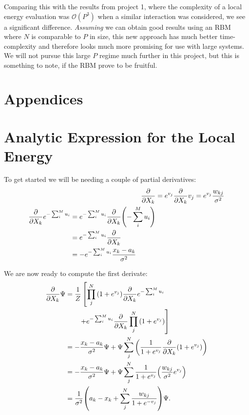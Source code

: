 \documentclass[a4paper, 11pt]{article}
\begin{document}
\begin{multicols}{2}
    Comparing this with the results from project 1, where the complexity of a
    local energy evaluation was $\mathcal{O}(P^3)$ when a similar interaction
    was considered, we see a significant
    difference. \emph{Assuming} we can obtain good results using an RBM where $N$ is
    comparable to $P$ in size, this new approach has much better time-complexity
    and therefore looks much more promising for use with large systems. We will
    not pursue this large $P$ regime much further in this project, but this is
    something to note, if the RBM prove to be fruitful.


    \printbibliography

\end{multicols}




\pagebreak
\begin{multicols}{2}
    \appendix
    \section*{Appendices}

    \section{Analytic Expression for the Local Energy}
    \label{app:E-L-derivation}
    
    To get started we will be needing a couple of partial derivatives:
   \begin{align}
        \pdv{}{X_k} (1+e^{v_j}) &=e^{v_j}\pdv{}{X_k}v_j =
        e^{v_j} \frac{w_{kj}}{\sigma^2}\\
        \begin{split}
        \pdv{}{X_k}e^{-\sum_i^M u_i} &= e^{-\sum_i^M
        u_i}\pdv{}{X_k}\qty(-\sum_i^M u_i) \\
        &= e^{-\sum_i^M u_i}\pdv{}{X_k} (-u_k) \\
        &= -e^{-\sum_i^M u_i} \frac{x_k-a_k}{\sigma^2}
        \end{split}
    \end{align}

    We are now ready to compute the first derivate:
    \begin{align*}
        \pdv{}{X_k}\Psi &= \frac{1}{Z} \left[\prod_j^N
        \qty(1+e^{v_j})\pdv{}{X_k}e^{-\sum_i^M u_i}\right.\\
        &\quad{  }\quad{    }\left. + e^{-\sum_i^M
        u_i}\pdv{}{X_k} \prod_j^N \qty(1+e^{v_j})\right]\\
        &= -\frac{x_k-a_k}{\sigma^2}\Psi + \Psi \sum_j^N
        \qty(\frac{1}{1+e^{v_j}}\pdv{}{X_k}\qty(1+e^{v_j}))\\
        &= -\frac{x_k-a_k}{\sigma^2}\Psi + \Psi\sum_j^N
        \frac{1}{1+e^{v_j}}\qty(\frac{w_{kj}}{\sigma^2} e^{v_j})\\
        &= \frac{1}{\sigma^2}\qty(a_k-x_k + \sum_j^N
        \frac{w_{kj}}{1+e^{-v_j}})\Psi.
    \end{align*}


\end{multicols}
\end{document}
